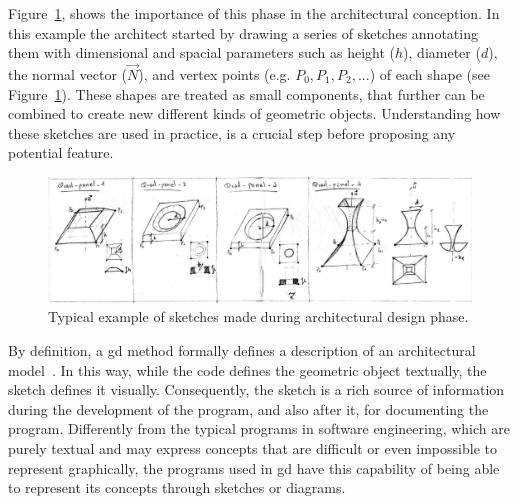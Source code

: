 Figure~\ref{fig:sketch-fig}, shows the importance of this phase in the architectural conception. In this example the architect started by drawing a series of sketches annotating them with dimensional and spacial parameters such as height ($h$), diameter ($d$), the normal vector ($\vec{N}$), and vertex points (e.g. $P_0, P_1, P_2, ...$) of each shape (see Figure~\ref{fig:sketch-fig}). These shapes are treated as small components, that further can be combined to create new different kinds of geometric objects. Understanding how these sketches are used in practice, is a crucial step before proposing any potential feature.

\begin{figure}[!h]
  \centering
  \includegraphics[width=1\textwidth]{images/real-sketch}
    \caption{Typical example of sketches made during architectural design phase.}
  \label{fig:sketch-fig}
\end{figure}


By definition, a \gls{gd} method formally defines a description of an architectural model~\citep{mccormack2004generative}. In this way, while the code defines the geometric object textually, the sketch defines it visually. Consequently, the sketch is a rich source of information during the development of the program, and also after it, for documenting the program. Differently from the typical programs in software engineering, which are purely textual and may express concepts that are difficult or even impossible to represent graphically, the programs used in \gls{gd} have this capability of being able to represent its concepts through sketches or diagrams.

